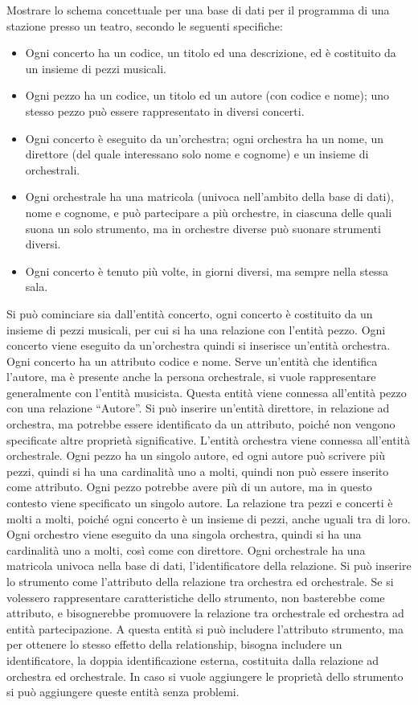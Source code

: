\documentclass{article}
\numberwithin{equation}{subsection}
\begin{document}
Mostrare lo schema concettuale per una base di dati per il programma di una stazione presso un teatro, secondo le seguenti specifiche:
\begin{itemize}
    \item Ogni concerto ha un codice, un titolo ed una descrizione, ed è costituito da un insieme di pezzi musicali. 
    \item Ogni pezzo ha un codice, un titolo ed un autore (con codice e nome); uno stesso pezzo può essere rappresentato in diversi concerti. 
    \item Ogni concerto è eseguito da un'orchestra; ogni orchestra ha un nome, un direttore (del quale interessano solo nome e cognome) e un insieme di orchestrali. 
    \item Ogni orchestrale ha una matricola (univoca nell'ambito della base di dati), nome e cognome, e può partecipare a più orchestre, in ciascuna delle quali suona un solo strumento, ma in orchestre diverse può suonare strumenti diversi. 
    \item Ogni concerto è tenuto più volte, in giorni diversi, ma sempre nella stessa sala. 
\end{itemize}

Si può cominciare sia dall'entità concerto, ogni concerto è costituito da un insieme di pezzi musicali, per cui si ha una relazione con l'entità 
pezzo. Ogni concerto viene eseguito da un'orchestra quindi si inserisce un'entità orchestra. Ogni concerto ha un attributo codice e nome. 
Serve un'entità che identifica l'autore, ma è presente anche la persona orchestrale, si vuole rappresentare generalmente con l'entità musicista. Questa entità viene 
connessa all'entità pezzo con una relazione ``Autore''. Si può inserire un'entità direttore, in relazione ad orchestra, ma potrebbe essere 
identificato da un attributo, poiché non vengono specificate altre proprietà significative. L'entità orchestra viene connessa all'entità orchestrale. 
Ogni pezzo ha un singolo autore, ed ogni autore può scrivere più pezzi, quindi si ha una cardinalità uno a molti, quindi non può essere 
inserito come attributo. Ogni pezzo potrebbe avere più di un autore, ma in questo contesto viene specificato un singolo autore. La relazione tra 
pezzi e concerti è molti a molti, poiché ogni concerto è un insieme di pezzi, anche uguali tra di loro. 
Ogni orchestro viene eseguito da una singola orchestra, quindi si ha una cardinalità uno a molti, così come con direttore. 
Ogni orchestrale ha una matricola univoca nella base di dati, l'identificatore della relazione. Si può inserire lo strumento come l'attributo della 
relazione tra orchestra ed orchestrale. Se si volessero rappresentare caratteristiche dello strumento, non basterebbe come attributo, e 
bisognerebbe promuovere la relazione tra orchestrale ed orchestra ad entità partecipazione. A questa entità si può includere l'attributo 
strumento, ma per ottenere lo stesso effetto della relationship, bisogna includere un identificatore, la doppia identificazione esterna, costituita 
dalla relazione ad orchestra ed orchestrale. In caso si vuole aggiungere le proprietà dello strumento si può aggiungere queste entità senza problemi. 
\end{document}
